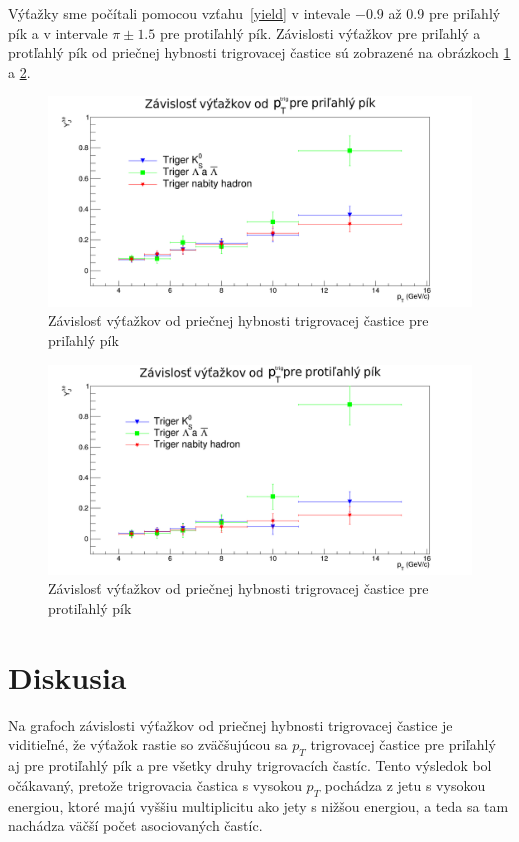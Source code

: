 \documentclass[thesismargins, thesislinespacing]{rnthesis}
\begin{document}
Výťažky sme počítali pomocou vzťahu~\ref{yield} v intevale $-0.9$ až 0.9 pre priľahlý pík a v intervale $\pi\pm1.5$ pre protiľahlý pík. Závislosti výťažkov pre priľahlý a protľahlý pík od priečnej hybnosti trigrovacej častice sú zobrazené na obrázkoch \ref{near} a \ref{away}.

\begin{figure}[hbtp!]
	\centering
	\includegraphics[width=\textwidth]{./Obrazky_praca/vytazok_near.png}
	\caption{Závislosť výťažkov od priečnej hybnosti trigrovacej častice pre priľahlý pík}
	\label{near}
\end{figure}

\begin{figure}[hbtp!]
	\centering
	\includegraphics[width=\textwidth]{./Obrazky_praca/vytazok_away.png}
	\caption{Závislosť výťažkov od priečnej hybnosti trigrovacej častice pre protiľahlý pík}
	\label{away}
\end{figure}

\chapter{Diskusia}
 
Na grafoch závislosti výťažkov od priečnej hybnosti trigrovacej častice je viditieľné, že výťažok rastie so zväčšujúcou sa $p_T$ trigrovacej častice pre priľahlý aj pre protiľahlý pík a pre všetky druhy trigrovacích častíc. Tento výsledok bol očákavaný, pretože trigrovacia častica s vysokou $p_T$ pochádza z jetu s vysokou energiou, ktoré majú vyššiu multiplicitu ako jety s nižšou energiou, a teda sa tam nachádza väčší počet asociovaných častíc. 
\end{document}
